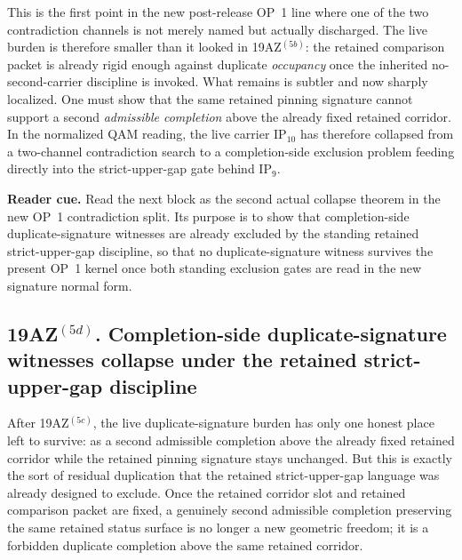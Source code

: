\begin{remark}
\label{rem:what-first-collapse-buys-next-op1-step}
This is the first point in the new post-release OP~1 line where one of the two contradiction channels is not merely named but actually discharged. The live burden is therefore smaller than it looked in 19AZ$^{(5b)}$: the retained comparison packet is already rigid enough against duplicate \emph{occupancy} once the inherited no-second-carrier discipline is invoked. What remains is subtler and now sharply localized. One must show that the same retained pinning signature cannot support a second \emph{admissible completion} above the already fixed retained corridor. In the normalized QAM reading, the live carrier \(\mathrm{IP}_{10}\) has therefore collapsed from a two-channel contradiction search to a completion-side exclusion problem feeding directly into the strict-upper-gap gate behind \(\mathrm{IP}_9\).
\end{remark}




\noindent\textbf{Reader cue.} Read the next block as the second actual collapse theorem in the new OP~1 contradiction split. Its purpose is to show that completion-side duplicate-signature witnesses are already excluded by the standing retained strict-upper-gap discipline, so that no duplicate-signature witness survives the present OP~1 kernel once both standing exclusion gates are read in the new signature normal form.

\subsection*{19AZ$^{(5d)}$. Completion-side duplicate-signature witnesses collapse under the retained strict-upper-gap discipline}
\label{sec:completion-side-duplicate-signature-witnesses-collapse-strict-upper-gap}
After 19AZ$^{(5c)}$, the live duplicate-signature burden has only one honest place left to survive: as a second admissible completion above the already fixed retained corridor while the retained pinning signature stays unchanged. But this is exactly the sort of residual duplication that the retained strict-upper-gap language was already designed to exclude. Once the retained corridor slot and retained comparison packet are fixed, a genuinely second admissible completion preserving the same retained status surface is no longer a new geometric freedom; it is a forbidden duplicate completion above the same retained corridor.

